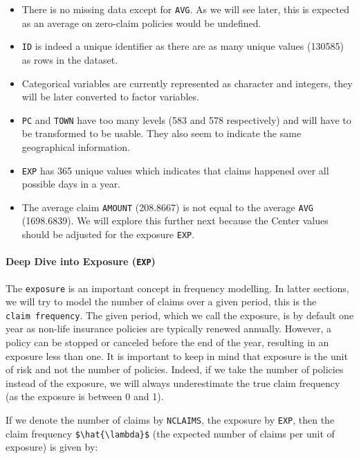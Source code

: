 \documentclass[
  english,
  11pt,
]{article}
\providecommand{\tightlist}{%
  \setlength{\itemsep}{0pt}\setlength{\parskip}{0pt}}
\begin{document}
\begin{itemize}
\tightlist
\item
  There is no missing data except for \texttt{AVG}. As we will see
  later, this is expected as an average on zero-claim policies would be
  undefined.
\item
  \texttt{ID} is indeed a unique identifier as there are as many unique
  values (130585) as rows in the dataset.
\item
  Categorical variables are currently represented as character and
  integers, they will be later converted to factor variables.
\item
  \texttt{PC} and \texttt{TOWN} have too many levels (583 and 578
  respectively) and will have to be transformed to be usable. They also
  seem to indicate the same geographical information.
\item
  \texttt{EXP} has 365 unique values which indicates that claims
  happened over all possible days in a year.
\item
  The average claim \texttt{AMOUNT} (208.8667) is not equal to the
  average \texttt{AVG} (1698.6839). We will explore this further next
  because the Center values should be adjusted for the exposure
  \texttt{EXP}.
\end{itemize}

\paragraph{\texorpdfstring{Deep Dive into Exposure
(\texttt{EXP})}{Deep Dive into Exposure (EXP)}}\label{deep-dive-into-exposure-exp}

The \texttt{exposure} is an important concept in frequency modelling. In
latter sections, we will try to model the number of claims over a given
period, this is the \texttt{claim\ frequency}. The given period, which
we call the exposure, is by default one year as non-life insurance
policies are typically renewed annually. However, a policy can be
stopped or canceled before the end of the year, resulting in an exposure
less than one. It is important to keep in mind that exposure is the unit
of risk and not the number of policies. Indeed, if we take the number of
policies instead of the exposure, we will always underestimate the true
claim frequency (as the exposure is between 0 and 1).

If we denote the number of claims by \texttt{NCLAIMS}, the exposure by
\texttt{EXP}, then the claim frequency
\texttt{\$\textbackslash{}hat\{\textbackslash{}lambda\}\$} (the expected
number of claims per unit of exposure) is given by:
\end{document}
